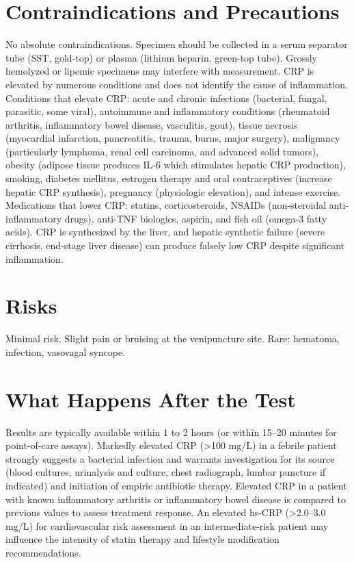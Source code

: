 \section*{Contraindications and Precautions}
No absolute contraindications. Specimen should be collected in a serum separator tube (SST, gold-top) or plasma (lithium heparin, green-top tube). Grossly hemolyzed or lipemic specimens may interfere with measurement. CRP is elevated by numerous conditions and does not identify the cause of inflammation. Conditions that elevate CRP: acute and chronic infections (bacterial, fungal, parasitic, some viral), autoimmune and inflammatory conditions (rheumatoid arthritis, inflammatory bowel disease, vasculitis, gout), tissue necrosis (myocardial infarction, pancreatitis, trauma, burns, major surgery), malignancy (particularly lymphoma, renal cell carcinoma, and advanced solid tumors), obesity (adipose tissue produces IL-6 which stimulates hepatic CRP production), smoking, diabetes mellitus, estrogen therapy and oral contraceptives (increase hepatic CRP synthesis), pregnancy (physiologic elevation), and intense exercise. Medications that lower CRP: statins, corticosteroids, NSAIDs (non-steroidal anti-inflammatory drugs), anti-TNF biologics, aspirin, and fish oil (omega-3 fatty acids). CRP is synthesized by the liver, and hepatic synthetic failure (severe cirrhosis, end-stage liver disease) can produce falsely low CRP despite significant inflammation.

\section*{Risks}
Minimal risk. Slight pain or bruising at the venipuncture site. Rare: hematoma, infection, vasovagal syncope.

\section*{What Happens After the Test}
Results are typically available within 1 to 2 hours (or within 15--20 minutes for point-of-care assays). Markedly elevated CRP (>100 mg/L) in a febrile patient strongly suggests a bacterial infection and warrants investigation for its source (blood cultures, urinalysis and culture, chest radiograph, lumbar puncture if indicated) and initiation of empiric antibiotic therapy. Elevated CRP in a patient with known inflammatory arthritis or inflammatory bowel disease is compared to previous values to assess treatment response. An elevated hs-CRP (>2.0--3.0 mg/L) for cardiovascular risk assessment in an intermediate-risk patient may influence the intensity of statin therapy and lifestyle modification recommendations.

